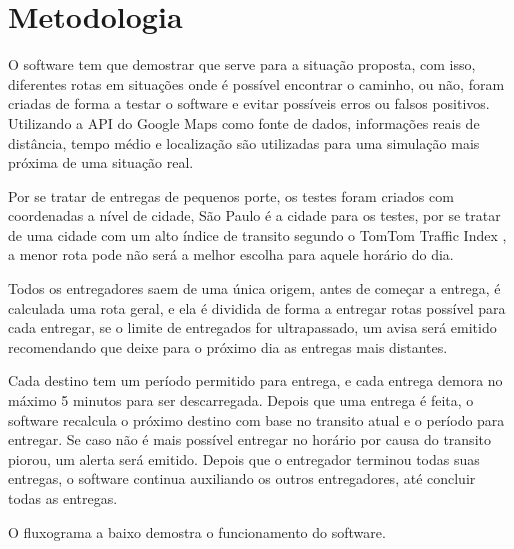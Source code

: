 \chapter{Metodologia}
O software tem que demostrar que serve para a situação proposta, com isso, diferentes rotas em situações onde é possível encontrar o caminho, ou não, foram criadas de forma a testar o software e evitar possíveis erros ou falsos positivos.
Utilizando a API do Google Maps como fonte de dados, informações reais de distância, tempo médio e localização são utilizadas para uma simulação mais próxima de uma situação real.

Por se tratar de entregas de pequenos porte, os testes foram criados com coordenadas a nível de cidade, São Paulo é a cidade para os testes, por se tratar de uma cidade com um alto índice de transito segundo o TomTom Traffic Index \cite{TomTom}, a menor rota pode não será a melhor escolha para aquele horário do dia.

Todos os entregadores saem de uma única origem, antes de começar a entrega, é calculada uma rota geral, e ela é dividida de forma a entregar rotas possível para cada entregar, se o limite de entregados for ultrapassado, um avisa será emitido recomendando que deixe para o próximo dia as entregas mais distantes.

Cada destino tem um período permitido para entrega, e cada entrega demora no máximo 5 minutos para ser descarregada. Depois que uma entrega é feita, o software recalcula o próximo destino com base no transito atual e o período para entregar.
Se caso não é mais possível entregar no horário por causa do transito piorou, um alerta será emitido. Depois que o entregador terminou todas suas entregas, o software continua auxiliando os outros entregadores, até concluir todas as entregas.

O fluxograma a baixo demostra o funcionamento do software.

\begin{minipage}{\linewidth}
	\label{fig:FluxoSoftare}
\end{minipage}

